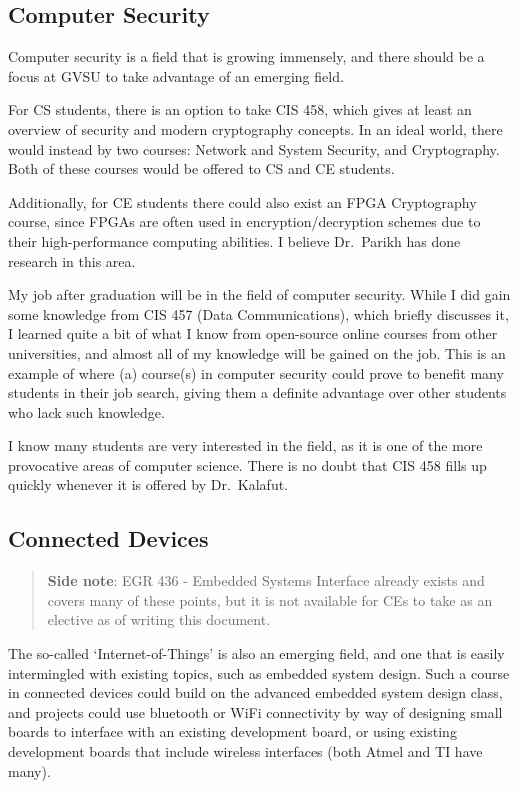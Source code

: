 \documentclass[12pt]{article}
\numberwithin{figure}{section}
\numberwithin{equation}{section}
\begin{document}
{\subsection{Computer Security}\label{computer-security}
Computer security is a field that is growing immensely, and there should
be a focus at GVSU to take advantage of an emerging field.

\bigskip

For CS students, there is an option to take CIS 458, which gives at
least an overview of security and modern cryptography concepts. In an
ideal world, there would instead by two courses: Network and System
Security, and Cryptography. Both of these courses would be offered to CS
and CE students.

\bigskip

Additionally, for CE students there could also exist an FPGA
Cryptography course, since FPGAs are often used in encryption/decryption
schemes due to their high-performance computing abilities. I believe
Dr.~Parikh has done research in this area.

\bigskip

My job after graduation will be in the field of computer security. While
I did gain some knowledge from CIS 457 (Data Communications), which
briefly discusses it, I learned quite a bit of what I know from
open-source online courses from other universities, and almost all of my
knowledge will be gained on the job. This is an example of where (a)
course(s) in computer security could prove to benefit many students in
their job search, giving them a definite advantage over other students
who lack such knowledge.

\bigskip

I know many students are very interested in the field, as it is one of
the more provocative areas of computer science. There is no doubt that
CIS 458 fills up quickly whenever it is offered by Dr.~Kalafut.

\subsection{Connected Devices}\label{connected-devices}
\begin{quote}
\textbf{Side note}: EGR 436 - Embedded Systems Interface already
exists and covers many of these points, but it is not available for CEs
to take as an elective as of writing this document.
\end{quote}

The so-called `Internet-of-Things' is also an emerging field, and one
that is easily intermingled with existing topics, such as embedded
system design. Such a course in connected devices could build on the
advanced embedded system design class, and projects could use bluetooth
or WiFi connectivity by way of designing small boards to interface with
an existing development board, or using existing development boards that
include wireless interfaces (both Atmel and TI have many).

}
\end{document}

